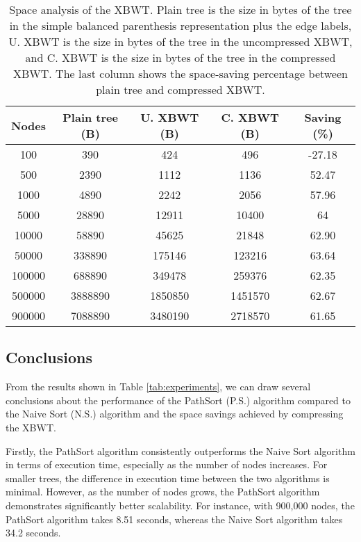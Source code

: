 \begin{table}[h]
    \centering
    \begin{tabular}{|c|c|c|c|c|}
        \hline
        \textbf{Nodes} & \textbf{Plain tree (B)} & \textbf{U. XBWT (B)} & \textbf{C. XBWT (B)} & \textbf{Saving (\%)} \\
        \hline
        100 & 390 & 424 & 496 & -27.18 \\
        500 & 2390 & 1112 & 1136 & 52.47 \\
        1000 & 4890 & 2242 & 2056 & 57.96 \\
        5000 & 28890 & 12911 & 10400 & 64 \\
        10000 & 58890 & 45625 & 21848 & 62.90 \\
        50000 & 338890 & 175146 & 123216 & 63.64 \\
        100000 & 688890 & 349478 & 259376 & 62.35 \\
        500000 & 3888890 & 1850850 & 1451570 & 62.67 \\
        900000 & 7088890 & 3480190 & 2718570 & 61.65 \\
        \hline
    \end{tabular}
    \caption{Space analysis of the XBWT. Plain tree is the size in bytes of the tree in the simple balanced parenthesis representation plus the edge labels, U. XBWT is the size in bytes of the tree in the uncompressed XBWT, and C. XBWT is the size in bytes of the tree in the compressed XBWT. The last column shows the space-saving percentage between plain tree and compressed XBWT.}
    \label{tab:experiments_2}
\end{table}

\subsection{Conclusions}
From the results shown in Table \ref{tab:experiments}, we can draw several conclusions about the performance of the PathSort (P.S.) algorithm compared to the Naive Sort (N.S.) algorithm and the space savings achieved by compressing the XBWT.

Firstly, the PathSort algorithm consistently outperforms the Naive Sort algorithm in terms of execution time, especially as the number of nodes increases. For smaller trees, the difference in execution time between the two algorithms is minimal. However, as the number of nodes grows, the PathSort algorithm demonstrates significantly better scalability. For instance, with 900,000 nodes, the PathSort algorithm takes 8.51 seconds, whereas the Naive Sort algorithm takes 34.2 seconds.

